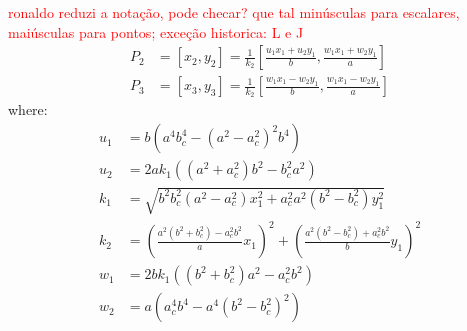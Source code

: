 \textcolor{red}{ronaldo reduzi a notação, pode checar? que tal minúsculas para escalares, maiúsculas para pontos; exceção historica: L e J}
\begin{align}
    P_2& =[x_2,y_2]=\frac{1}{k_2}\left[\frac{u_1 x_1 + u_2 y_1}{b} ,  \frac{w_1 x_1 + w_2 y_1}{a} \right] \label{eq:03-n3-conc-general} \\
    P_3&=[x_3,y_3]=\frac{1}{k_2}\left[\frac{w_1 x_1 - w_2 y_1}{b},\frac{w_1 x_1 - w_2 y_1}{a}\right] \nonumber
\end{align}
where:
\begin{align*}
    u_1 &=b\left(a^4  b_c^4 -(a^2 -  a_c^2)^2 b^4 \right) \\
    u_2 &= 2 a k_1 \left( (a^2 + a_c^2)b^2 - b_c^2 a^2\right) \\
    k_1&=\sqrt{ b^2  b_c^2 (a^2 -  a_c^2)  x_1^2 +  a_c^2 a^2(b^2 -  b_c^2)  y_1^2}\\
    k_2 &=\left(\frac{a^2 (b^2 +  b_c^2) - a_c^2 b^2 }{a}x_1\right)^2+ \left(\frac{a^2 (b^2 -  b_c^2) + a_c^2b^2 }{b} y_1\right)^2\\
    w_1&=2 b k_1\left( (b^2 +  b_c^2) a^2 - a_c^2 b^2\right) \\
    w_2&= a\left(a_c^4b^4-a^4(b^2-b_c^2)^2\right)
\end{align*}
